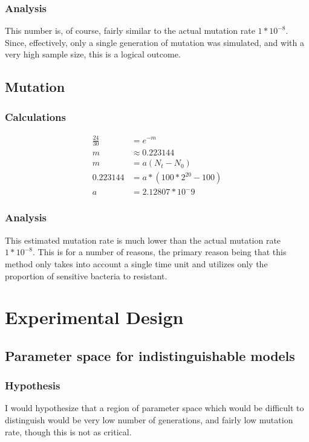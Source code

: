 \documentclass[titlepage]{scrreprt}
\begin{document}
\subsubsection{Analysis}
This number is, of course, fairly similar to the actual mutation rate $1*10^{-8}$.  Since, effectively, only a single generation of mutation was simulated, and with a very high sample size, this is a logical outcome.
\subsection{Mutation}
\subsubsection{Calculations}
\begin{equation*}
    \begin{split}
        \frac{24}{30} &= e^{-m} \\
        m &\approx 0.223144 \\
        m &= a(N_t-N_0) \\
        0.223144 &= a*(100*2^{20}-100) \\
        a &= 2.12807*10^-9 %
    \end{split}
\end{equation*}
\subsubsection{Analysis}
This estimated mutation rate is much lower than the actual mutation rate $1*10^{-8}$.  This is for a number of reasons, the primary reason being that this method only takes into account a single time unit and utilizes only the proportion of sensitive bacteria to resistant.
\section{Experimental Design}
\subsection{Parameter space for indistinguishable models}
\subsubsection{Hypothesis}
I would hypothesize that a region of parameter space which would be difficult to distinguish would be very low number of generations, and fairly low mutation rate, though this is not as critical.
\end{document}
